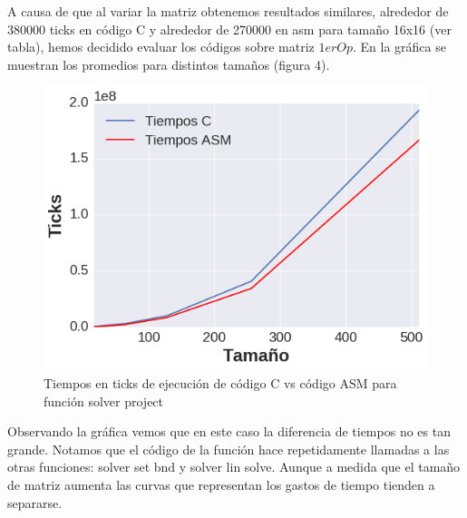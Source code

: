 A causa de que al variar la matriz obtenemos resultados similares, alrededor de 380000 ticks en código C y alrededor de 270000 en asm para tamaño 16x16 (ver tabla), hemos decidido evaluar los códigos sobre matriz $1erOp$. En la gráfica se muestran los promedios para distintos tamaños (figura 4).
\begin{figure}[h]

\centering
\includegraphics[scale=0.6] {solver_project}
   \caption{Tiempos en ticks de ejecución de código C vs código ASM para función solver project}
\end{figure}

Observando la gráfica vemos que en este caso la diferencia de tiempos no es tan grande. Notamos que el código de la función hace repetidamente llamadas a las otras funciones: solver set bnd y solver lin solve. Aunque a medida que el tamaño de matriz aumenta las curvas que representan los gastos de tiempo tienden a separarse.




